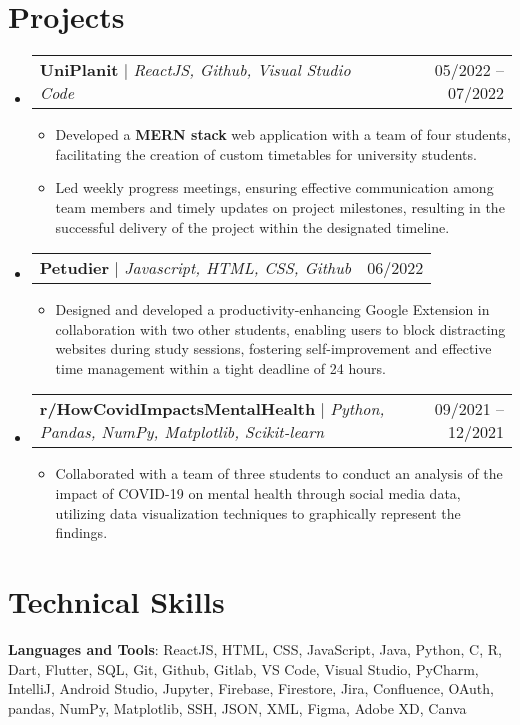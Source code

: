 \documentclass[letterpaper,11pt]{article}
\makeatletter
\newcommand{\resumeItem}[1]{
  \item\small{
    {#1 \vspace{-2pt}}
  }
}
\newcommand{\resumeProjectHeading}[2]{
    \item
    \begin{tabular*}{0.97\textwidth}{l@{\extracolsep{\fill}}r}
      \small#1 & #2 \\
    \end{tabular*}\vspace{-7pt}
}
\newcommand{\resumeSubHeadingListStart}{\begin{itemize}[leftmargin=0.15in, label={}]}
\newcommand{\resumeSubHeadingListEnd}{\end{itemize}}
\newcommand{\resumeItemListStart}{\begin{itemize}}
\newcommand{\resumeItemListEnd}{\end{itemize}\vspace{-5pt}}
\makeatother
\begin{document}
\section{Projects}
    \resumeSubHeadingListStart
      \resumeProjectHeading
          {\textbf{UniPlanit} $|$ \emph{ReactJS,  Github, Visual Studio Code}}{05/2022 -- 07/2022}
          \resumeItemListStart
            \resumeItem{Developed a \textbf{MERN stack} web application with a team of four students, facilitating the creation of custom timetables for university students.}
            \resumeItem{Led weekly progress meetings, ensuring effective communication among team members and timely updates on project milestones, resulting in the successful delivery of the project within the designated timeline.}
          \resumeItemListEnd
      \resumeProjectHeading
          {\textbf{Petudier} $|$ \emph{Javascript, HTML, CSS, Github}}{06/2022}
          \resumeItemListStart
            \resumeItem{Designed and developed a productivity-enhancing Google Extension in collaboration with two other students, enabling users to block distracting websites during study sessions, fostering self-improvement and effective time management within a tight deadline of 24 hours.}
          \resumeItemListEnd
        \resumeProjectHeading   {\textbf{r/HowCovidImpactsMentalHealth} $|$ \emph{Python, Pandas, NumPy, Matplotlib, Scikit-learn}}{09/2021 -- 12/2021}
          \resumeItemListStart
            \resumeItem{Collaborated with a team of three students to conduct an analysis of the impact of COVID-19 on mental health through social media data, utilizing data visualization techniques to graphically represent the findings.}
          \resumeItemListEnd
    \resumeSubHeadingListEnd



%
\section{Technical Skills}
 \begin{itemize}[leftmargin=0.15in, label={}]
    \small{\item{
     \textbf{Languages and Tools}{: ReactJS, HTML, CSS, JavaScript, Java, Python, C, R, Dart, Flutter, SQL, Git, Github, Gitlab, VS Code, Visual Studio, PyCharm, IntelliJ, Android Studio, Jupyter, Firebase, Firestore, Jira, Confluence, OAuth, pandas, NumPy, Matplotlib, SSH, JSON, XML, Figma, Adobe XD, Canva} \\
    }}
 \end{itemize}


\end{document}

